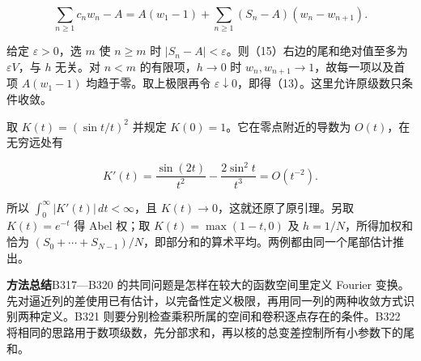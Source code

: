 \documentclass[11pt,a4paper]{article}
\begin{document}
\begin{equation}
\sum_{n\ge1} c_nw_n-A
=A(w_1-1)+\sum_{n\ge1}(S_n-A)(w_n-w_{n+1}) .\tag{15}
\end{equation}

给定 \(\varepsilon>0\)，选 \(m\) 使 \(n\ge m\) 时
\(|S_n-A|<\varepsilon\)。则（15）右边的尾和绝对值至多为
\(\varepsilon V\)，与 \(h\) 无关。对 \(n<m\) 的有限项，\(h\to0\) 时
\(w_n,w_{n+1}\to1\)，故每一项以及首项 \(A(w_1-1)\)
均趋于零。取上极限再令
\(\varepsilon\downarrow0\)，即得（13）。这里允许原级数只条件收敛。

取 \(K(t)=(\sin t/t)^2\) 并规定 \(K(0)=1\)。它在零点附近的导数为
\(O(t)\)，在无穷远处有

\begin{equation}
K'(t)=\frac{\sin(2t)}{t^2}-\frac{2\sin^2 t}{t^3}=O(t^{-2}).
\tag{16}
\end{equation}

所以 \(\int_0^\infty|K'(t)|\,dt<\infty\)，且
\(K(t)\to0\)，这就还原了原引理。另取 \(K(t)=e^{-t}\) 得 Abel 权；取
\(K(t)=\max(1-t,0)\) 及 \(h=1/N\)，所得加权和恰为
\((S_0+\cdots+S_{N-1})/N\)，即部分和的算术平均。两例都由同一个尾部估计推出。

\par\medskip\noindent{}\textbf{方法总结}\quad B317---B320 的共同问题是怎样在较大的函数空间里定义 Fourier
变换。先对逼近列的差使用已有估计，以完备性定义极限，再用同一列的两种收敛方式识别两种定义。B321
则要分别检查乘积所属的空间和卷积逐点存在的条件。B322
将相同的思路用于数项级数，先分部求和，再以核的总变差控制所有小参数下的尾和。
\end{document}
